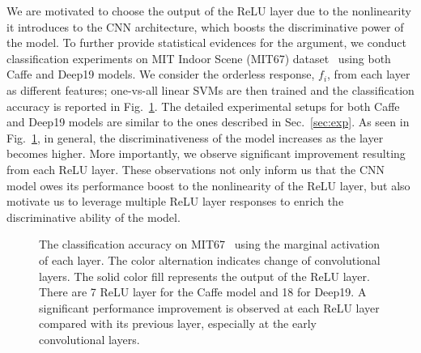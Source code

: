 \documentclass[10pt,twocolumn,letterpaper]{article}
\begin{document}
We are motivated to choose the output of the ReLU layer due to the nonlinearity it introduces to the CNN architecture, which boosts the discriminative power of the model. To further provide statistical evidences for the argument, we conduct classification experiments on MIT Indoor Scene (MIT67) dataset~\cite{MIT67} using both Caffe and Deep19 models. We consider the orderless response, $f_i$, from each layer as different features; one-vs-all linear SVMs are then trained and the classification accuracy is reported in Fig.~\ref{fig:layer_MIT67}. The detailed experimental setups for both Caffe and Deep19 models are similar to the ones described in Sec.~\ref{sec:exp}. As seen in Fig.~\ref{fig:layer_MIT67}, in general, the discriminativeness of the model increases as the layer becomes higher. More importantly, we observe significant improvement resulting from each ReLU layer. These observations not only inform us that the CNN model owes its performance boost to the nonlinearity of the ReLU layer, but also motivate us to leverage multiple ReLU layer responses to enrich the discriminative ability of the model. 

\begin{figure}[htbp]
\centering
\caption{The classification accuracy on MIT67~\cite{MIT67} using the marginal activation of each layer. The color alternation indicates change of convolutional layers. The solid color fill represents the output of the ReLU layer. There are 7 ReLU layer for the Caffe model and 18 for Deep19. A significant performance improvement is observed at each ReLU layer compared with its previous layer, especially at the early convolutional layers.}

\label{fig:layer_MIT67}
\end{figure}
\end{document}
